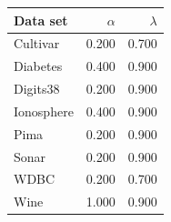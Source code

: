 \begin{tabular}{lrr}
\toprule
Data set & $\alpha$ & $\lambda$ \\
\midrule
Cultivar & 0.200 & 0.700 \\
Diabetes & 0.400 & 0.900 \\
Digits38 & 0.200 & 0.900 \\
Ionosphere & 0.400 & 0.900 \\
Pima & 0.200 & 0.900 \\
Sonar & 0.200 & 0.900 \\
WDBC & 0.200 & 0.700 \\
Wine & 1.000 & 0.900 \\
\bottomrule
\end{tabular}
